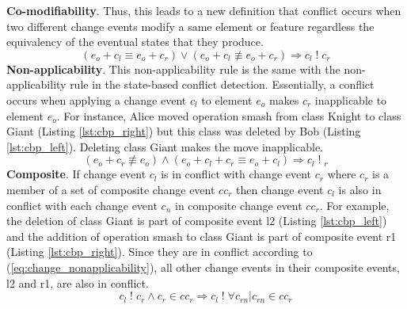 \textbf{Co-modifiability}. Thus, this leads to a new definition that conflict occurs when two different change events modify a same element or feature regardless the equivalency of the eventual states that they produce. 
\begin{equation} \label{eq:change_comodifiabilty}
(e_{o} + c_{l} \equiv e_{o} + c_{r}) \vee (e_{o} + c_{l} \not\equiv e_{o} + c_{r}) \Rightarrow c_{l}\;!\;c_{r}
\end{equation} 
\textbf{Non-applicability}. This non-applicability rule is the same with the non-applicability rule in the state-based conflict detection. Essentially, a conflict occurs when applying a change event $c_{l}$ to element $e_{o}$ makes $c_{r}$ inapplicable to element $e_{o}$. For instance, Alice moved operation \textsf{smash} from class \textsf{Knight} to class \textsf{Giant} (Listing \ref{lst:cbp_right}) but this class was deleted by Bob (Listing \ref{lst:cbp_left}). Deleting class \textsf{Giant} makes the move inapplicable. 
\begin{equation} \label{eq:change_nonapplicability}
(e_{o} + c_{r} \not\equiv e_{o}) \wedge (e_{o} + c_{l} + c_{r} \equiv e_{o} + c_{l}) \Rightarrow c_{l}\;!\;_{r}
\end{equation}
\textbf{Composite}. If change event $c_{l}$ is in conflict with change event $c_{r}$ where $c_{r}$ is a member of a set of composite change event $cc_{r}$ then change event $c_{l}$ is also in conflict with each change event $c_{n}$ in composite change event $cc_{r}$. For example, the deletion of class \textsf{Giant} is part of composite event \textsf{l2} (Listing \ref{lst:cbp_left}) and the addition of operation \textsf{smash} to class \textsf{Giant} is part of composite event \textsf{r1} (Listing \ref{lst:cbp_right}). Since they are in conflict according to (\ref{eq:change_nonapplicability}), all other change events in their composite events, \textsf{l2} and \textsf{r1}, are also in conflict.
\begin{equation} \label{eq:change_composite}
c_{l}\;!\;c_{r} \wedge c_{r} \in cc_{r} \Rightarrow c_{l}\;!\; \forall c_{rn} | c_{rn} \in cc_{r}
\end{equation}


